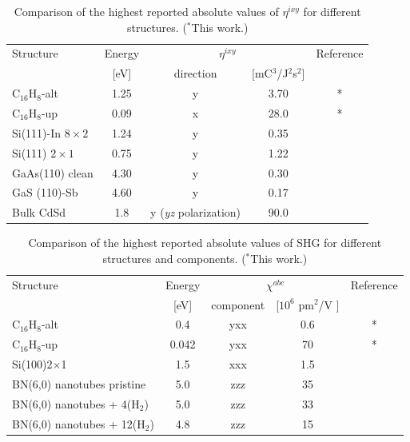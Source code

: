 \documentclass[pss]{wiley2sp} %
\begin{document}
\begin{table}
    \caption{Comparison of the highest reported absolute values of {$\eta^{ixy}$} for 
    different structures. ($^{*}$This work.)}
    \label{tab:etacomp}
    \centering
    \begin{tabular}{lcccc}
    Structure & Energy &  \multicolumn{2}{c}{$\eta^{ixy}$} &  Reference\\
    \cline{3-4}
              & [eV]   & direction & [mC$^{3}$/J$^{2}$s$^{2}$] \\
    \hline
    C$_{16}$H$_{8}$-alt               & 1.25  & y & 3.70  & *     \\
    C$_{16}$H$_{8}$-up                & 0.09  & x & 28.0  & *     \\
    Si(111)-In $8\times2$   & 1.24  & y & 0.35  & \cite{arzate2014optical}  \\
    Si(111) $2\times1$      & 0.75  & y & 1.22  & \cite{mendoza2012optical} \\
    GaAs(110) clean         & 4.30  & y & 0.30  & \cite{nastos2007full}     \\
    GaS (110)-Sb            & 4.60  & y & 0.17  & \cite{cabellos2011optical}\\
    Bulk CdSd               & 1.8   & y {\scriptsize (\emph{yz} polarization)} 
    & 90.0  & \cite{nastos2006optical}  \\
    \end{tabular}
\end{table}


\begin{table}
    \caption{Comparison of the highest reported absolute values of SHG for 
    different structures and components. ($^{*}$This work.)}
    \label{tab:shgcomp}
    \centering
    \begin{tabular}{lcccc}
    Structure & Energy & \multicolumn{2}{c}{$\chi^{abc} $} &  Reference\\
    \cline{3-4}
              & [eV]   & component & [$10^{6} $ pm$^{2}$/V ] \\
    \hline
    C$_{16}$H$_{8}$-alt                       & 0.4   & yxx   & 0.6   & *     \\
    C$_{16}$H$_{8}$-up                        & 0.042 & yxx   & 70    & *     \\
    Si(100)2$\times$1               & 1.5   & xxx   & 1.5   & \cite{andersonPRB15} \ \\
    BN(6,0) nanotubes pristine      & 5.0   & zzz   & 35    & \cite{salazar2014molecular} \\
    BN(6,0) nanotubes + 4(H$_{2}$)  & 5.0   & zzz   & 33    & \cite{salazar2014molecular} \\
    BN(6,0) nanotubes + 12(H$_{2}$) & 4.8   & zzz   & 15    & \cite{salazar2014molecular} \\
    \end{tabular}
\end{table}
\end{document}
